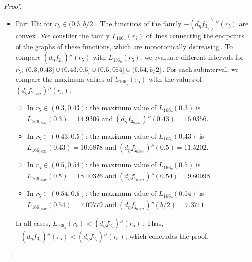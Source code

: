 \documentclass[final,11pt]{article}
\numberwithin{equation}{section}
\theoremstyle{definition}
\begin{document}
\begin{proof}
\begin{itemize}
\begin{itemize}

\item For $\eta\in(0.037,0.26]$\,. Our computational calculations show that the maximum values of the family $-(d_{\eta}f_{3_{\eta}})''(r_{5})$ form a strictly increasing sequence\,. Therefore, an upper bound is $-d_{\eta}f''_{3_{0.26}}(0)=28.0721$\,. Hence $-(d_{\eta}f_{3_{\eta}})''(r_{5})<(d_{\eta}f_{2_{\eta}})''(r_{5})$.

\item For $\eta\in(0.26,\infty)$\,. According to Properties \ref{spfs}, the functions of the family $-(d_{\eta}f_{3_{\eta}})''(r_{5})$ are monotonically decreasing\,. Therefore, 
the upper bound is given by $-(d_{\eta}f_{3_{\eta}})''(0)$, with a maximum value of $-d_{\eta}f''_{3_{0.3575}}(0)=29.4401$\,. Hence $-(d_{\eta}f_{3_{\eta}})''(r_{5})<(d_{\eta}f_{2_{\eta}})''(r_{5})$.
\end{itemize}

\item Part IIb: for $r_{5}\in(0.3,b/2]$\,. The functions of the family  $-(d_{\eta}f_{3_{\eta}})''(r_{5})$ are convex\,.  We consider the family $L_{166_{\eta}}(r_{5})$ of lines connecting the endpoints of the graphs of these functions, which are monotonically decreasing\,. To compare $(d_{\eta}f_{2_{\eta}})''(r_{5})$ with  $L_{166_{\eta}}(r_{5})$, we evaluate different intervals for $r_{5}$, $(0.3,0.43]\cup(0.43,0.5]\cup(0.5,054]\cup(0.54,b/2]$\,. For each subinterval, we compare the maximum values of $L_{166_{\eta}}(r_{5})$ with the values of $(d_{\eta}f_{2_{0.037}})''(r_{5})$:
\begin{itemize}
\item In $r_{5}\in(0.3,0.43)$: the maximum value of $L_{166_{\eta}}(0.3)$ is $L_{166_{0.037}}(0.3)=14.9306$ and $(d_{\eta}f_{2_{0.037}})''(0.43)=16.0356$.
\item In $r_{5}\in(0.43,0.5)$: the maximum value of  $L_{166_{\eta}}(0.43)$  is $L_{166_{0.037}}(0.43)=10.6878$ and $(d_{\eta}f_{2_{0.037}})''(0.5)=11.5202$.
\item In $r_{5}\in(0.5,0.54)$: the maximum value of  $L_{166_{\eta}}(0.5)$ is $L_{166_{0.037}}(0.5)=18.40326$ and $(d_{\eta}f_{2_{0.037}})''(0.54)=9.60098$.
\item In $r_{5}\in(0.54,0.6)$: the maximum value of  $L_{166_{\eta}}(0.54)$ is $L_{166_{0.037}}(0.54)=7.09779$ and $(d_{\eta}f_{2_{0.037}})''(b/2)=7.3711$.
\end{itemize}
In all cases, $L_{166_{\eta}}(r_{5})<(d_{\eta}f_{2_{\eta}})''(r_{5})$\,. Thus, $-(d_{\eta}f_{3_{\eta}})''(r_{5})<(d_{\eta}f_{2_{\eta}})''(r_{5})$, which concludes the proof.
\end{itemize}
\end{proof}
\end{document}
